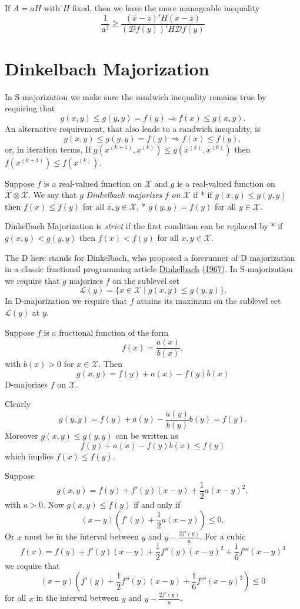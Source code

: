 \documentclass[
  12pt,
]{book}
\begin{document}
If \(A=aH\) with \(H\) fixed, then we have the more manageable inequality
\[
\frac{1}{a^2}\geq \frac{(x-z)'H(x-z)}{(\mathcal{D}f(y))'H\mathcal{D}f(y)}
\]

\hypertarget{dinkelbach-majorization-1}{%
\section{Dinkelbach Majorization}\label{dinkelbach-majorization-1}}

In S-majorization we make sure the sandwich inequality remains true by requiring that
\[
g(x,y)\leq g(y,y)=f(y)\Rightarrow f(x)\leq g(x,y).
\]
An alternative requirement, that also leads to a sandwich inequality, is
\[
g(x,y)\leq g(y,y)=f(y)\Rightarrow f(x)\leq f(y),
\]
or, in iteration terms,
If \(g(x^{(k+1)},x^{(k)})\leq g(x^{(k)},x^{(k)})\)
then \(f(x^{(k+1)})\leq f(x^{(k)})\).

Suppose \(f\) is a real-valued function on \(\mathcal{X}\) and \(g\) is a real-valued function on \(\mathcal{X}\otimes\mathcal{X}\). We say
that \(g\) \emph{Dinkelbach majorizes} \(f\) \emph{on} \(\mathcal{X}\) if
* if \(g(x,y)\leq g(y,y)\) then \(f(x)\leq f(y)\) for all \(x,y\in\mathcal{X}\),
* \(g(y,y)=f(y)\) for all \(y\in\mathcal{X}\).

Dinkelbach Majorization is \emph{strict} if the first condition can be replaced by
* if \(g(x,y)<g(y,y)\) then \(f(x)<f(y)\) for all \(x,y\in\mathcal{X}\).

The D here stands for Dinkelbach, who proposed a forerunner of D majorization in a classic fractional programming article \protect\hyperlink{ref-dinkelbach_67}{Dinkelbach} (\protect\hyperlink{ref-dinkelbach_67}{1967}). In S-majorization we require that \(g\) majorizes \(f\) on the sublevel set
\[
\mathcal{L}(y)=\{x\in\mathcal{X}\mid g(x,y)\leq g(y,y)\}.
\]
In D-majorization we require that \(f\) attains its maximum on the sublevel set \(\mathcal{L}(y)\) at \(y\).

Suppose \(f\) is a fractional function of the form
\[
f(x)=\frac{a(x)}{b(x)},
\]
with \(b(x)>0\) for \(x\in\mathcal{X}\). Then
\[
g(x,y)=f(y)+a(x)-f(y)b(x)
\]
D-majorizes \(f\) on \(\mathcal{X}\).

Clearly
\[
g(y,y)=f(y)+a(y)-\frac{a(y)}{b(y)}b(y)=f(y).
\]
Moreover \(g(x,y)\leq g(y,y)\) can be written as
\[
f(y)+a(x)-f(y)b(x)\leq f(y)
\]
which implies \(f(x)\leq f(y)\).

Suppose
\[
g(x,y)=f(y)+f'(y)(x-y)+\frac12 a(x-y)^2,
\]
with \(a>0\). Now \(g(x,y)\leq f(y)\) if and only if
\[
(x-y)(f'(y)+\frac12a(x-y))\leq 0,
\]
Or \(x\) must be in the interval between \(y\) and \(y-\frac{2f'(y)}{a}\). For a cubic
\[
f(x)=f(y)+f'(y)(x-y)+\frac12 f''(y)(x-y)^2+\frac16 f'''(x-y)^3
\]
we require that
\[
(x-y)(f'(y)+\frac12 f''(y)(x-y)+\frac16 f'''(x-y)^2)\leq 0
\]
for all \(x\) in the interval between \(y\) and \(y-\frac{2f'(y)}{a}\).
\end{document}
